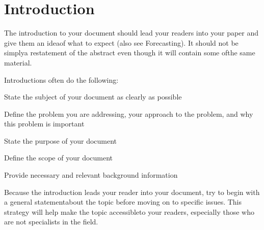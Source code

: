 \section{Introduction}
The introduction to your document should lead your readers into your paper and give them an ideaof what to expect (also see Forecasting). It should not be simplya restatement of the abstract even though it will contain some ofthe same material.

Introductions often do the following:

State the subject of your document as clearly as possible

Define the problem you are addressing, your approach to the problem, and why this problem is important

State the purpose of your document

Define the scope of your document

Provide necessary and relevant background information

Because the introduction leads your reader into your document, try to begin with a general statementabout the topic before moving on to specific issues. This strategy will help make the topic accessibleto your readers, especially those who are not specialists in the field.

